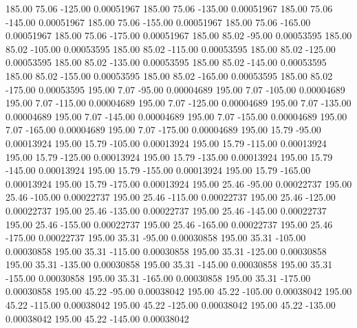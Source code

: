     185.00     75.06   -125.00     0.00051967
    185.00     75.06   -135.00     0.00051967
    185.00     75.06   -145.00     0.00051967
    185.00     75.06   -155.00     0.00051967
    185.00     75.06   -165.00     0.00051967
    185.00     75.06   -175.00     0.00051967
    185.00     85.02    -95.00     0.00053595
    185.00     85.02   -105.00     0.00053595
    185.00     85.02   -115.00     0.00053595
    185.00     85.02   -125.00     0.00053595
    185.00     85.02   -135.00     0.00053595
    185.00     85.02   -145.00     0.00053595
    185.00     85.02   -155.00     0.00053595
    185.00     85.02   -165.00     0.00053595
    185.00     85.02   -175.00     0.00053595
    195.00      7.07    -95.00     0.00004689
    195.00      7.07   -105.00     0.00004689
    195.00      7.07   -115.00     0.00004689
    195.00      7.07   -125.00     0.00004689
    195.00      7.07   -135.00     0.00004689
    195.00      7.07   -145.00     0.00004689
    195.00      7.07   -155.00     0.00004689
    195.00      7.07   -165.00     0.00004689
    195.00      7.07   -175.00     0.00004689
    195.00     15.79    -95.00     0.00013924
    195.00     15.79   -105.00     0.00013924
    195.00     15.79   -115.00     0.00013924
    195.00     15.79   -125.00     0.00013924
    195.00     15.79   -135.00     0.00013924
    195.00     15.79   -145.00     0.00013924
    195.00     15.79   -155.00     0.00013924
    195.00     15.79   -165.00     0.00013924
    195.00     15.79   -175.00     0.00013924
    195.00     25.46    -95.00     0.00022737
    195.00     25.46   -105.00     0.00022737
    195.00     25.46   -115.00     0.00022737
    195.00     25.46   -125.00     0.00022737
    195.00     25.46   -135.00     0.00022737
    195.00     25.46   -145.00     0.00022737
    195.00     25.46   -155.00     0.00022737
    195.00     25.46   -165.00     0.00022737
    195.00     25.46   -175.00     0.00022737
    195.00     35.31    -95.00     0.00030858
    195.00     35.31   -105.00     0.00030858
    195.00     35.31   -115.00     0.00030858
    195.00     35.31   -125.00     0.00030858
    195.00     35.31   -135.00     0.00030858
    195.00     35.31   -145.00     0.00030858
    195.00     35.31   -155.00     0.00030858
    195.00     35.31   -165.00     0.00030858
    195.00     35.31   -175.00     0.00030858
    195.00     45.22    -95.00     0.00038042
    195.00     45.22   -105.00     0.00038042
    195.00     45.22   -115.00     0.00038042
    195.00     45.22   -125.00     0.00038042
    195.00     45.22   -135.00     0.00038042
    195.00     45.22   -145.00     0.00038042

